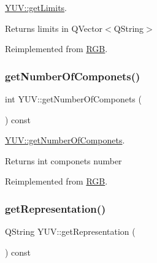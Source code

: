 \hyperlink{class_y_u_v_a344cd573b663c97f5554afcb1c15458c}{Y\+U\+V\+::get\+Limits}. 

\begin{DoxyReturn}{Returns}
limits in Q\+Vector$<$\+Q\+String$>$ 
\end{DoxyReturn}


Reimplemented from \hyperlink{class_r_g_b_a4ae8d5c061e45f557a5924f2237c1d0e}{R\+GB}.

\mbox{\label{class_y_u_v_a46eded5c13a0c2b2e9bbf05d4a2f9c7c}} 
\subsubsection{\texorpdfstring{get\+Number\+Of\+Componets()}{getNumberOfComponets()}}
{\footnotesize\ttfamily int Y\+U\+V\+::get\+Number\+Of\+Componets (\begin{DoxyParamCaption}{ }\end{DoxyParamCaption}) const\hspace{0.3cm}{\ttfamily [virtual]}}



\hyperlink{class_y_u_v_a46eded5c13a0c2b2e9bbf05d4a2f9c7c}{Y\+U\+V\+::get\+Number\+Of\+Componets}. 

\begin{DoxyReturn}{Returns}
int componets number 
\end{DoxyReturn}


Reimplemented from \hyperlink{class_r_g_b_a7561d57d6706bc25ea10762d906b2345}{R\+GB}.

\mbox{\label{class_y_u_v_ae38403ffd397003eb28ab7670f95d1e5}} 
\subsubsection{\texorpdfstring{get\+Representation()}{getRepresentation()}}
{\footnotesize\ttfamily Q\+String Y\+U\+V\+::get\+Representation (\begin{DoxyParamCaption}{ }\end{DoxyParamCaption}) const\hspace{0.3cm}{\ttfamily [virtual]}}



